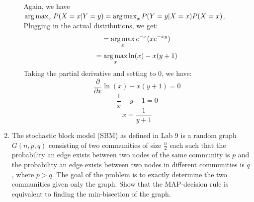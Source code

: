 \begin{enumerate}
\begin{enumerate}
        Again, we have $\operatorname*{arg\,max}_x P(X=x|Y=y) = \operatorname*{arg\,max}_x P(Y=y|X=x)P(X=x)$. Plugging in the actual distributions, we get:
        $$=\operatorname*{arg\,max}_x e^{-x}(xe^{-xy})$$
        $$=\operatorname*{arg\,max}_x \ln(x) - x(y+1)$$
        Taking the partial derivative and setting to $0$, we have:
        $$\frac{\partial}{\partial x} \ln(x) - x(y+1) = 0$$
        $$\frac{1}{x} - y - 1 = 0$$
        $$x = \frac{1}{y+1}$$
    \end{enumerate}

  \item The stochastic block model (SBM) as defined in Lab 9 is a random graph $G(n,p,q)$ consisting of two communities of size $\frac{n}{2}$ each such that the probability an edge exists between two nodes of the same community is $p$ and the probability an edge exists between two nodes in different communities is $q$, where $p > q$. The goal of the problem is to exactly determine the two communities given only the graph. Show that the MAP-decision rule is equivalent to finding the min-bisection of the graph.\\\\


\end{enumerate}
